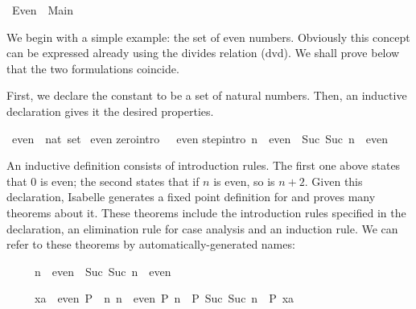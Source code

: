 %
\begin{isabellebody}%
\def\isabellecontext{Even}%
\isanewline
{}\ Even\ {\isacharequal}\ Main{\isacharcolon}%
\begin{isamarkuptext}%
We begin with a simple example: the set of even numbers.  Obviously this
concept can be expressed already using the divides relation (dvd).  We shall
prove below that the two formulations coincide.

First, we declare the constant  to be a set of natural numbers.
Then, an inductive declaration gives it the desired properties.%
\end{isamarkuptext}%
\ even\ {\isacharcolon}{\isacharcolon}\ {\isachardoublequote}nat\ set{\isachardoublequote}\isanewline
{}\ even\isanewline
{}\isanewline
zero{\isacharbrackleft}intro{\isacharbang}{\isacharbrackright}{\isacharcolon}\ {\isachardoublequote}{}\ {\isasymin}\ even{\isachardoublequote}\isanewline
step{\isacharbrackleft}intro{\isacharbang}{\isacharbrackright}{\isacharcolon}\ {\isachardoublequote}n\ {\isasymin}\ even\ {\isasymLongrightarrow}\ {\isacharparenleft}Suc\ {\isacharparenleft}Suc\ n{\isacharparenright}{\isacharparenright}\ {\isasymin}\ even{\isachardoublequote}%
\begin{isamarkuptext}%
An inductive definition consists of introduction rules.  The first one
above states that 0 is even; the second states that if $n$ is even, so is
$n+2$.  Given this declaration, Isabelle generates a fixed point definition
for  and proves many theorems about it.  These theorems include the
introduction rules specified in the declaration, an elimination rule for case
analysis and an induction rule.  We can refer to these theorems by
automatically-generated names:

\begin{isabelle}%
\ \ \ \ \ n\ {\isasymin}\ even\ {\isasymLongrightarrow}\ Suc\ {\isacharparenleft}Suc\ n{\isacharparenright}\ {\isasymin}\ even%
\end{isabelle}

\begin{isabelle}%
\ \ \ \ \ {\isasymlbrakk}xa\ {\isasymin}\ even{\isacharsemicolon}\ P\ {}{\isacharsemicolon}\ {\isasymAnd}n{\isachardot}\ {\isasymlbrakk}n\ {\isasymin}\ even{\isacharsemicolon}\ P\ n{\isasymrbrakk}\ {\isasymLongrightarrow}\ P\ {\isacharparenleft}Suc\ {\isacharparenleft}Suc\ n{\isacharparenright}{\isacharparenright}{\isasymrbrakk}\ {\isasymLongrightarrow}\ P\ xa%
\end{isabelle}


\end{isamarkuptext}
\end{isabellebody}
